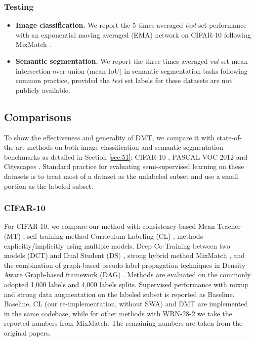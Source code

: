 \documentclass[preprint,review,10pt]{elsarticle}
\begin{document}
\subsubsection{Testing}
\label{sec:523}

\begin{itemize}
    \item \textbf{Image classification.} We report the 5-times averaged \textit{test} set performance with an exponential moving averaged (EMA) network on CIFAR-10 following MixMatch \cite{berthelot2019mixmatch}.
    \item \textbf{Semantic segmentation.} We report the three-times averaged \textit{val} set mean intersection-over-union (mean IoU) in semantic segmentation tasks following common practice, provided the \textit{test} set labels for these datasets are not publicly available.
\end{itemize}





\subsection{Comparisons}
\label{sec:53}
To show the effectiveness and generality of DMT, we compare it with state-of-the-art methods on both image classification and semantic segmentation benchmarks as detailed in Section \ref{sec:51}: CIFAR-10 \cite{krizhevsky2009learning}, PASCAL VOC 2012 \cite{everingham2015pascal} and Cityscapes \cite{cordts2016cityscapes}. Standard practice for evaluating semi-supervised learning on these datasets is to treat most of a dataset as the unlabeled subset and use a small portion as the labeled subset.


\subsubsection{CIFAR-10}
\label{sec:531}

For CIFAR-10, we compare our method with consistency-based Mean Teacher (MT) \cite{tarvainen2017mean}, self-training method Curriculum Labeling (CL) \cite{cascante2020curriculum}, methods explicitly/implicitly using multiple models, Deep Co-Training between two models (DCT) \cite{qiao2018deep} and Dual Student (DS) \cite{ke2019dual}, strong hybrid method MixMatch \cite{berthelot2019mixmatch}, and the combination of graph-based pseudo label propagation techniques in Density Aware Graph-based framework (DAG) \cite{li2020density}. Methods are evaluated on the commonly adopted 1,000 labels and 4,000 labels splits. Supervised performance with mixup and strong data augmentation on the labeled subset is reported as Baseline. Baseline, CL (our re-implementation, without SWA) and DMT are implemented in the same codebase, while for other methods with WRN-28-2 we take the reported numbers from MixMatch. The remaining numbers are taken from the original papers.
\end{document}
